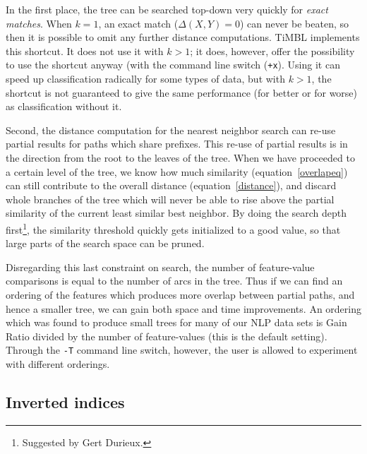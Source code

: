 \documentclass{report}
\begin{document}
In the first place, the tree can be searched top-down very quickly for
{\em exact matches}. When $k=1$, an exact match ($\Delta(X,Y)=0$) can
never be beaten, so then it is possible to omit any further distance
computations. TiMBL implements this shortcut. It does not use it with
$k>1$; it does, however, offer the possibility to use the shortcut
anyway (with the command line switch ({\tt +x}). Using it can speed up
classification radically for some types of data, but with $k>1$, the
shortcut is not guaranteed to give the same performance (for better or
for worse) as classification without it.

Second, the distance computation for the nearest neighbor search can
re-use partial results for paths which share prefixes.  This re-use of
partial results is in the direction from the root to the leaves of the
tree. When we have proceeded to a certain level of the tree, we know
how much similarity (equation~\ref{overlapeq}) can still contribute to
the overall distance (equation~\ref{distance}), and discard whole
branches of the tree which will never be able to rise above the
partial similarity of the current least similar best neighbor. By
doing the search depth first\footnote{Suggested by Gert Durieux.}, the
similarity threshold quickly gets initialized to a good value, so that
large parts of the search space can be pruned.

Disregarding this last constraint on search, the number of feature-value
comparisons is equal to the number of arcs in the tree. Thus if we can
find an ordering of the features which produces more overlap between
partial paths, and hence a smaller tree, we can gain both space and
time improvements. An ordering which was found to produce small trees
for many of our NLP data sets is Gain Ratio divided by the number of
feature-values (this is the default setting). Through the {\tt -T}
command line switch, however, the user is allowed to experiment with
different orderings.

\subsection{Inverted indices}
\end{document}
